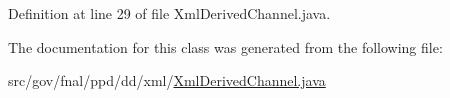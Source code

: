 Definition at line 29 of file Xml\-Derived\-Channel.\-java.



The documentation for this class was generated from the following file\-:\begin{DoxyCompactItemize}
\item 
src/gov/fnal/ppd/dd/xml/\hyperlink{XmlDerivedChannel_8java}{Xml\-Derived\-Channel.\-java}\end{DoxyCompactItemize}
